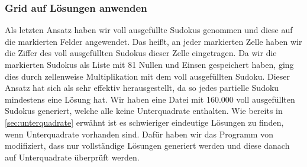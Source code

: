 \subsubsection{Grid auf Lösungen anwenden}
Als letzten Ansatz haben wir voll ausgefüllte Sudokus genommen und diese auf die markierten Felder angewendet.
Das heißt, an jeder markierten Zelle haben wir die Ziffer des voll ausgefüllten Sudokus dieser Zelle eingetragen.
Da wir die markierten Sudokus als Liste mit 81 Nullen und Einsen gespeichert haben,
ging dies durch zellenweise Multiplikation mit dem voll ausgefüllten Sudoku.
Dieser Ansatz hat sich als sehr effektiv herausgestellt, da so jedes partielle Sudoku mindestens eine Lösung hat.
Wir haben eine Datei mit 160.000 voll ausgefüllten Sudokus generiert, welche alle keine Unterquadrate enthalten.
Wie bereits in \cref{sec:unterquadrate} erwähnt ist es schwieriger eindeutige Lösungen zu finden, wenn Unterquadrate vorhanden sind.
Dafür haben wir das Programm von~\cite{stunmuffin_sudoku_generator_2025} modifiziert, dass nur vollständige Lösungen generiert werden
und diese danach auf Unterquadrate überprüft werden.

